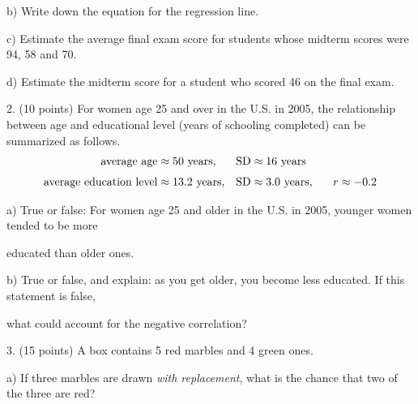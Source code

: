 \documentclass[10pt]{article}
\begin{document}
\hspace{20pt} b) Write down the equation for the regression line. %
\vspace{1in}

\hspace{20pt} c) 
Estimate the average final exam score for students whose midterm scores were
94, 58 and 70. %
\vspace{2.75in}

\hspace{20pt} d) Estimate the midterm score for a student who scored 46 on the final exam.
\vfill
\eject
{\ }


2. (10 points) For women age 25 and over in the U.S. in 2005, the relationship between
age and educational level (years of schooling completed) can be summarized as
follows. 
\begin{align*}
\mbox{average age}         & \approx \mbox{50 years,}    & \mbox{SD} & \approx \mbox{16 years}\\[3pt]
\mbox{average education level}  & \approx \mbox{13.2 years,}  & \mbox{SD} & \approx \mbox{3.0 years,
   \hspace{15pt}} r\approx -0.2
\end{align*}

\hspace{20pt} a) True or false:  For women age 25 and older in the U.S. in 2005, younger women tended 
to be more\vspace{-5pt}

\hspace{20pt} \hphantom{a) }  educated than older ones.
\bigskip

\hspace{20pt} b) True or false, and explain:  as you get older, you become less educated.  
If this statement is false,\vspace{-4pt}

\hspace{20pt} \hphantom{a) }
what could account for the negative correlation?  
\vspace{2.5in}

3. (15 points) A box contains 5 red marbles and 4 green ones.   

\hspace{20pt} a) If three marbles are drawn \textit{with replacement}, what is the chance
that two of the three are red?
\vspace{1.5in}
\end{document}
